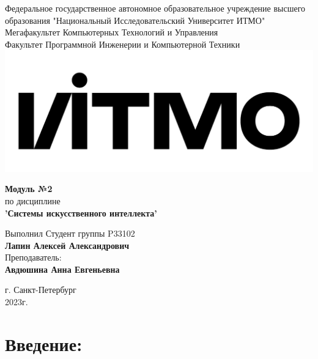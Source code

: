 \documentclass[12pt,onecolumn]{article}
\begin{document}
\setcounter{tocdepth}{4}
\begin{center}
    Федеральное государственное автономное образовательное учреждение высшего образования "Национальный Исследовательский Университет ИТМО"\\ 
    Мегафакультет Компьютерных Технологий и Управления\\
    Факультет Программной Инженерии и Компьютерной Техники \\
    \includegraphics[scale=0.3]{image/itmo.jpg} %
\end{center}
\vspace{1cm}


\begin{center}
    \textbf{Модуль №2}\\
    по дисциплине\\
    \textbf{'Системы искусственного интеллекта'}
\end{center}

\vspace{2cm}

\begin{flushright}
  Выполнил Студент  группы P33102\\
  \textbf{Лапин Алексей Александрович}\\
  Преподаватель: \\
  \textbf{Авдюшина Анна Евгеньевна}\\
\end{flushright}

\vspace{6cm}
\begin{center}
    г. Санкт-Петербург\\
    2023г.
\end{center}

\newpage
\tableofcontents
\newpage

\section{Введение:}
\end{document}
